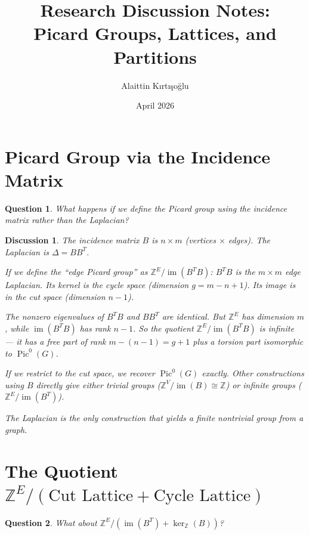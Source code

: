 \documentclass[11pt]{article}
\title{Research Discussion Notes:\\Picard Groups, Lattices, and Partitions}
\author{Alaittin K\i rt\i \c{s}o\u{g}lu}
\date{April 2026}
\newcommand{\Z}{\mathbb{Z}}
\newcommand{\Pic}{\operatorname{Pic}^0}
\newtheorem{question}{Question}
\newtheorem{answer}{Discussion}
\begin{document}
\maketitle
\tableofcontents

\section{Picard Group via the Incidence Matrix}

\begin{question}
What happens if we define the Picard group using the incidence matrix rather
than the Laplacian?
\end{question}

\begin{answer}
The incidence matrix $B$ is $n \times m$ (vertices $\times$ edges). The
Laplacian is $\Delta = BB^T$.

If we define the ``edge Picard group'' as $\Z^E / \operatorname{im}(B^T B)$:
$B^T B$ is the $m \times m$ edge Laplacian. Its kernel is the cycle space
(dimension $g = m - n + 1$). Its image is in the cut space (dimension $n-1$).

The nonzero eigenvalues of $B^T B$ and $BB^T$ are identical. But $\Z^E$ has
dimension $m$, while $\operatorname{im}(B^T B)$ has rank $n-1$. So the quotient
$\Z^E / \operatorname{im}(B^T B)$ is infinite --- it has a free part of rank
$m - (n-1) = g + 1$ plus a torsion part isomorphic to $\Pic(G)$.

If we restrict to the cut space, we recover $\Pic(G)$ exactly. Other
constructions using $B$ directly give either trivial groups ($\Z^V /
\operatorname{im}(B) \cong \Z$) or infinite groups ($\Z^E /
\operatorname{im}(B^T)$).

The Laplacian is the only construction that yields a finite nontrivial group
from a graph.
\end{answer}


\section{The Quotient $\Z^E / (\text{Cut Lattice} + \text{Cycle Lattice})$}

\begin{question}
What about $\Z^E / (\operatorname{im}(B^T) + \ker_{\Z}(B))$?
\end{question}
\end{document}
